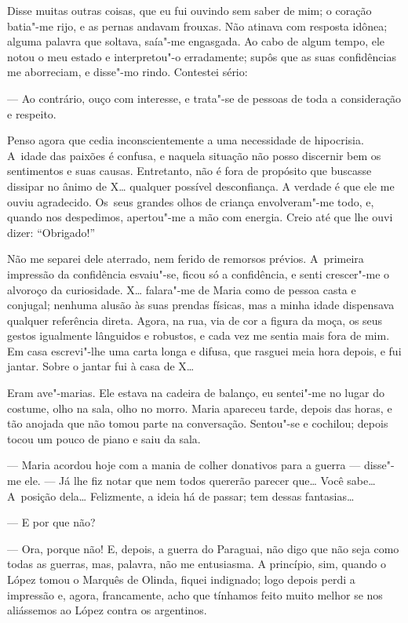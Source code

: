 \begin{linenumbers}
Disse muitas outras coisas, que eu fui ouvindo sem saber de mim; o
coração batia"-me rijo, e as pernas andavam frouxas. Não atinava com
resposta idônea; alguma palavra que soltava, saía"-me engasgada. Ao cabo
de algum tempo, ele notou o meu estado e interpretou"-o erradamente;
supôs que as suas confidências me aborreciam, e disse"-mo rindo.
Contestei sério:

--- Ao contrário, ouço com interesse, e trata"-se de pessoas de toda a
consideração e respeito.

Penso agora que cedia inconscientemente a uma necessidade de hipocrisia.
A~idade das paixões é confusa, e naquela situação não posso discernir
bem os sentimentos e suas causas. Entretanto, não é fora de propósito
que buscasse dissipar no ânimo de X\ldots{} qualquer possível desconfiança. A
verdade é que ele me ouviu agradecido. Os~seus grandes olhos de criança
envolveram"-me todo, e, quando nos despedimos, apertou"-me a mão com
energia. Creio até que lhe ouvi dizer: ``Obrigado!''

Não me separei dele aterrado, nem ferido de remorsos prévios. A~primeira
impressão da confidência esvaiu"-se, ficou só a confidência, e senti
crescer"-me o alvoroço da curiosidade. X\ldots{} falara"-me de Maria como de
pessoa casta e conjugal; nenhuma alusão às suas prendas físicas, mas a
minha idade dispensava qualquer referência direta. Agora, na rua, via de
cor a figura da moça, os seus gestos igualmente lânguidos e robustos, e
cada vez me sentia mais fora de mim. Em casa escrevi"-lhe uma carta longa
e difusa, que rasguei meia hora depois, e fui jantar. Sobre o jantar fui
à casa de X\ldots{}

Eram ave"-marias. Ele estava na cadeira de balanço, eu sentei"-me no lugar
do costume, olho na sala, olho no morro. Maria apareceu tarde, depois
das horas, e tão anojada que não tomou parte na conversação. Sentou"-se e
cochilou; depois tocou um pouco de piano e saiu da sala.

--- Maria acordou hoje com a mania de colher donativos para a guerra ---
disse"-me ele. --- Já lhe fiz notar que nem todos quererão parecer que\ldots{}
Você sabe\ldots{} A~posição dela\ldots{} Felizmente, a ideia há de passar; tem
dessas fantasias\ldots{}

--- E por que não?

--- Ora, porque não! E, depois, a guerra do Paraguai, não digo que não
seja como todas as guerras, mas, palavra, não me entusiasma. A
princípio, sim, quando o López tomou o Marquês de Olinda, fiquei
indignado; logo depois perdi a impressão e, agora, francamente, acho que
tínhamos feito muito melhor se nos aliássemos ao López contra os
argentinos.


\end{linenumbers}
